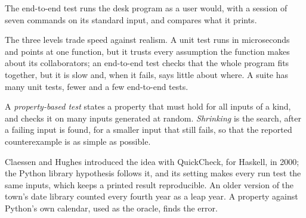 The end-to-end test runs the desk program as a user would, with a session of seven commands on its standard input, and compares what it prints.

\label{out:b3:software-engineering:desk}

The three levels trade speed against realism. A unit test runs in microseconds and points at one function, but it trusts every assumption the function makes about its collaborators; an end-to-end test checks that the whole program fits together, but it is slow and, when it fails, says little about where. A suite has many unit tests, fewer  and a few end-to-end tests.

\begin{definition}\label{def:b3:software-engineering:property}
A \emph{property-based test} states a property that must hold for all inputs of a kind, and checks it on many inputs generated at random. \emph{Shrinking} is the search, after a failing input is found, for a smaller input that still fails, so that the reported counterexample is as simple as possible.
\end{definition}

Claessen and Hughes introduced the idea with QuickCheck, for Haskell, in 2000; the Python library hypothesis follows it, and its setting  makes every run test the same inputs, which keeps a printed result reproducible. %
An older version of the town's date library counted every fourth year as a leap year. A property against Python's own calendar, used as the oracle, finds the error.

\label{lst:b3:software-engineering:prop}

\label{out:b3:software-engineering:prop}

